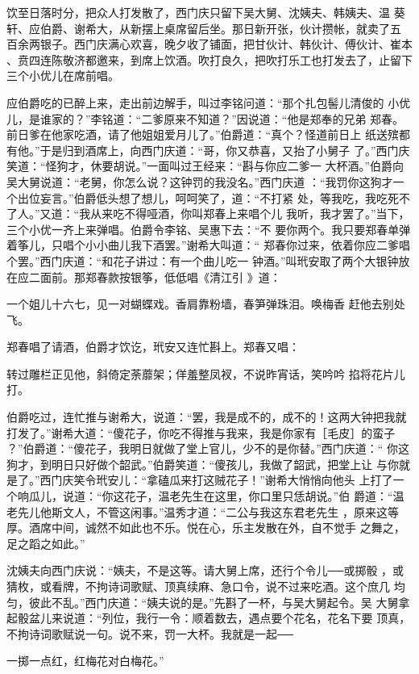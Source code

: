 饮至日落时分，把众人打发散了，西门庆只留下吴大舅、沈姨夫、韩姨夫、温
葵轩、应伯爵、谢希大，从新摆上桌席留后坐。那日新开张，伙计攒帐，就卖了五
百余两银子。西门庆满心欢喜，晚夕收了铺面，把甘伙计、韩伙计、傅伙计、崔本
、贲四连陈敬济都邀来，到席上饮酒。吹打良久，把吹打乐工也打发去了，止留下
三个小优儿在席前唱。

应伯爵吃的已醉上来，走出前边解手，叫过李铭问道：“那个扎包髻儿清俊的
小优儿，是谁家的？”李铭道：“二爹原来不知道？”因说道：“他是郑奉的兄弟
郑春。前日爹在他家吃酒，请了他姐姐爱月儿了。”伯爵道：“真个？怪道前日上
纸送殡都有他。”于是归到酒席上，向西门庆道：“哥，你又恭喜，又抬了小舅子
了。”西门庆笑道：“怪狗才，休要胡说。”一面叫过王经来：“斟与你应二爹一
大杯酒。”伯爵向吴大舅说道：“老舅，你怎么说？这钟罚的我没名。”西门庆道
：“我罚你这狗才一个出位妄言。”伯爵低头想了想儿，呵呵笑了，道：“不打紧
处，等我吃，我吃死不了人。”又道：“我从来吃不得哑酒，你叫郑春上来唱个儿
我听，我才罢了。”当下，三个小优一齐上来弹唱。伯爵令李铭、吴惠下去：“不
要你两个。我只要郑春单弹着筝儿，只唱个小小曲儿我下酒罢。”谢希大叫道：“
郑春你过来，依着你应二爹唱个罢。”西门庆道：“和花子讲过：有一个曲儿吃一
钟酒。”叫玳安取了两个大银钟放在应二面前。那郑春款按银筝，低低唱《清江引
》道：

一个姐儿十六七，见一对蝴蝶戏。香肩靠粉墙，春笋弹珠泪。唤梅香
赶他去别处飞。

郑春唱了请酒，伯爵才饮讫，玳安又连忙斟上。郑春又唱：

转过雕栏正见他，斜倚定荼蘼架；佯羞整凤衩，不说昨宵话，笑吟吟
掐将花片儿打。

伯爵吃过，连忙推与谢希大，说道：“罢，我是成不的，成不的！这两大钟把我就
打发了。”谢希大道：“傻花子，你吃不得推与我来，我是你家有［毛皮］的蛮子
？”伯爵道：“傻花子，我明日就做了堂上官儿，少不的是你替。”西门庆道：“
你这狗才，到明日只好做个韶武。”伯爵笑道：“傻孩儿，我做了韶武，把堂上让
与你就是了。”西门庆笑令玳安儿：“拿磕瓜来打这贼花子！”谢希大悄悄向他头
上打了一个响瓜儿，说道：“你这花子，温老先生在这里，你口里只恁胡说。”伯
爵道：“温老先儿他斯文人，不管这闲事。”温秀才道：“二公与我这东君老先生
，原来这等厚。酒席中间，诚然不如此也不乐。悦在心，乐主发散在外，自不觉手
之舞之，足之蹈之如此。”

沈姨夫向西门庆说：“姨夫，不是这等。请大舅上席，还行个令儿──或掷骰
，或猜枚，或看牌，不拘诗词歌赋、顶真续麻、急口令，说不过来吃酒。这个庶几
均匀，彼此不乱。”西门庆道：“姨夫说的是。”先斟了一杯，与吴大舅起令。吴
大舅拿起骰盆儿来说道：“列位，我行一令：顺着数去，遇点要个花名，花名下要
顶真，不拘诗词歌赋说一句。说不来，罚一大杯。我就是一起──

一掷一点红，红梅花对白梅花。”

